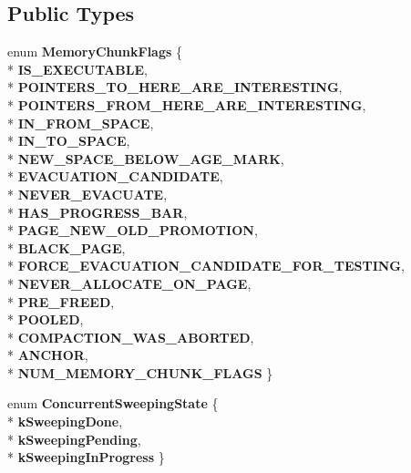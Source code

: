 \subsection*{Public Types}
\begin{DoxyCompactItemize}
\item 
enum {\bfseries Memory\+Chunk\+Flags} \{ \\*
{\bfseries I\+S\+\_\+\+E\+X\+E\+C\+U\+T\+A\+B\+LE}, 
\\*
{\bfseries P\+O\+I\+N\+T\+E\+R\+S\+\_\+\+T\+O\+\_\+\+H\+E\+R\+E\+\_\+\+A\+R\+E\+\_\+\+I\+N\+T\+E\+R\+E\+S\+T\+I\+NG}, 
\\*
{\bfseries P\+O\+I\+N\+T\+E\+R\+S\+\_\+\+F\+R\+O\+M\+\_\+\+H\+E\+R\+E\+\_\+\+A\+R\+E\+\_\+\+I\+N\+T\+E\+R\+E\+S\+T\+I\+NG}, 
\\*
{\bfseries I\+N\+\_\+\+F\+R\+O\+M\+\_\+\+S\+P\+A\+CE}, 
\\*
{\bfseries I\+N\+\_\+\+T\+O\+\_\+\+S\+P\+A\+CE}, 
\\*
{\bfseries N\+E\+W\+\_\+\+S\+P\+A\+C\+E\+\_\+\+B\+E\+L\+O\+W\+\_\+\+A\+G\+E\+\_\+\+M\+A\+RK}, 
\\*
{\bfseries E\+V\+A\+C\+U\+A\+T\+I\+O\+N\+\_\+\+C\+A\+N\+D\+I\+D\+A\+TE}, 
\\*
{\bfseries N\+E\+V\+E\+R\+\_\+\+E\+V\+A\+C\+U\+A\+TE}, 
\\*
{\bfseries H\+A\+S\+\_\+\+P\+R\+O\+G\+R\+E\+S\+S\+\_\+\+B\+AR}, 
\\*
{\bfseries P\+A\+G\+E\+\_\+\+N\+E\+W\+\_\+\+O\+L\+D\+\_\+\+P\+R\+O\+M\+O\+T\+I\+ON}, 
\\*
{\bfseries B\+L\+A\+C\+K\+\_\+\+P\+A\+GE}, 
\\*
{\bfseries F\+O\+R\+C\+E\+\_\+\+E\+V\+A\+C\+U\+A\+T\+I\+O\+N\+\_\+\+C\+A\+N\+D\+I\+D\+A\+T\+E\+\_\+\+F\+O\+R\+\_\+\+T\+E\+S\+T\+I\+NG}, 
\\*
{\bfseries N\+E\+V\+E\+R\+\_\+\+A\+L\+L\+O\+C\+A\+T\+E\+\_\+\+O\+N\+\_\+\+P\+A\+GE}, 
\\*
{\bfseries P\+R\+E\+\_\+\+F\+R\+E\+ED}, 
\\*
{\bfseries P\+O\+O\+L\+ED}, 
\\*
{\bfseries C\+O\+M\+P\+A\+C\+T\+I\+O\+N\+\_\+\+W\+A\+S\+\_\+\+A\+B\+O\+R\+T\+ED}, 
\\*
{\bfseries A\+N\+C\+H\+OR}, 
\\*
{\bfseries N\+U\+M\+\_\+\+M\+E\+M\+O\+R\+Y\+\_\+\+C\+H\+U\+N\+K\+\_\+\+F\+L\+A\+GS}
 \}\hypertarget{classv8_1_1internal_1_1_memory_chunk_a7ec096f924ab4515fe8ae00e9e50af78}{}\label{classv8_1_1internal_1_1_memory_chunk_a7ec096f924ab4515fe8ae00e9e50af78}

\item 
enum {\bfseries Concurrent\+Sweeping\+State} \{ \\*
{\bfseries k\+Sweeping\+Done}, 
\\*
{\bfseries k\+Sweeping\+Pending}, 
\\*
{\bfseries k\+Sweeping\+In\+Progress}
 \}\hypertarget{classv8_1_1internal_1_1_memory_chunk_a3eedfd88d0a89355dae40d476f931ac6}{}\label{classv8_1_1internal_1_1_memory_chunk_a3eedfd88d0a89355dae40d476f931ac6}

\end{DoxyCompactItemize}
